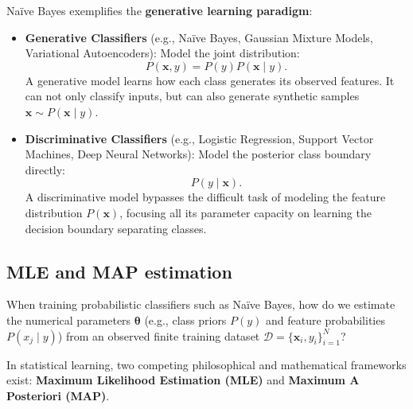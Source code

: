 Naïve Bayes exemplifies the \textbf{generative learning paradigm}:
\begin{itemize}
  \item \textbf{Generative Classifiers} (e.g., Naïve Bayes, Gaussian Mixture Models, Variational Autoencoders): Model the joint distribution:
  \begin{equation}
  P(\mathbf{x}, y) = P(y) P(\mathbf{x} \mid y).
  \end{equation}
  A generative model learns how each class generates its observed features. It can not only classify inputs, but can also generate synthetic samples $\mathbf{x} \sim P(\mathbf{x} \mid y)$.
  \item \textbf{Discriminative Classifiers} (e.g., Logistic Regression, Support Vector Machines, Deep Neural Networks): Model the posterior class boundary directly:
  \begin{equation}
  P(y \mid \mathbf{x}).
  \end{equation}
  A discriminative model bypasses the difficult task of modeling the feature distribution $P(\mathbf{x})$, focusing all its parameter capacity on learning the decision boundary separating classes.
\end{itemize}

\subsection{MLE and MAP estimation}
\label{sec:map_vs_mle}

When training probabilistic classifiers such as Naïve Bayes, how do we estimate the numerical parameters $\boldsymbol{\theta}$ (e.g., class priors $P(y)$ and feature probabilities $P(x_j \mid y)$) from an observed finite training dataset $\mathcal{D} = \{\mathbf{x}_i, y_i\}_{i=1}^N$?

In statistical learning, two competing philosophical and mathematical frameworks exist: \textbf{Maximum Likelihood Estimation (MLE)} and \textbf{Maximum A Posteriori (MAP)}.

